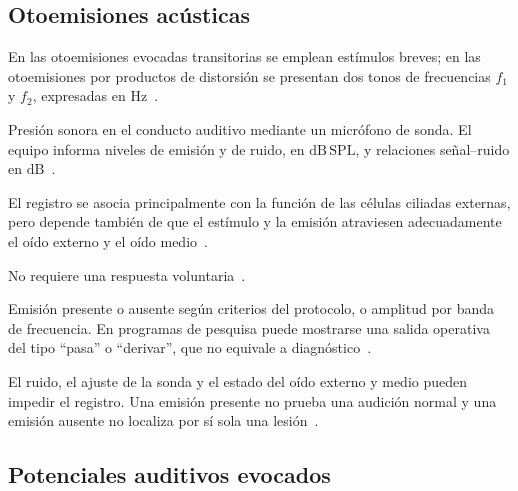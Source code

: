 \subsection{Otoemisiones acústicas}
\label{sec:u8-oea}

\begin{description}[style=nextline]
    \item[Estímulo.]
    En las otoemisiones evocadas transitorias se emplean estímulos breves; en
    las otoemisiones por productos de distorsión se presentan dos tonos de
    frecuencias \(f_1\) y \(f_2\), expresadas en \(\mathrm{Hz}\)~\cite{ashaTinnitus}.

    \item[Magnitud registrada.]
    Presión sonora en el conducto auditivo mediante un micrófono de sonda. El
    equipo informa niveles de emisión y de ruido, en \(\mathrm{dB\,SPL}\), y
    relaciones señal--ruido en \(\mathrm{dB}\)~\cite{ashaHearingAdults}.

    \item[Parte del sistema evaluada.]
    El registro se asocia principalmente con la función de las células
    ciliadas externas, pero depende también de que el estímulo y la emisión
    atraviesen adecuadamente el oído externo y el oído medio~\cite{ashaHearingAdults}.

    \item[Respuesta conductual.]
    No requiere una respuesta voluntaria~\cite{ashaHearingAdults}.

    \item[Resultado básico esperado.]
    Emisión presente o ausente según criterios del protocolo, o amplitud por
    banda de frecuencia. En programas de pesquisa puede mostrarse una salida
    operativa del tipo ``pasa'' o ``derivar'', que no equivale a diagnóstico~\cite{ashaHearingAdults}.

    \item[Limitaciones generales.]
    El ruido, el ajuste de la sonda y el estado del oído externo y medio pueden
    impedir el registro. Una emisión presente no prueba una audición normal y
    una emisión ausente no localiza por sí sola una lesión~\cite{ashaHearingAdults}.
\end{description}

\subsection{Potenciales auditivos evocados}
\label{sec:u8-pea}

